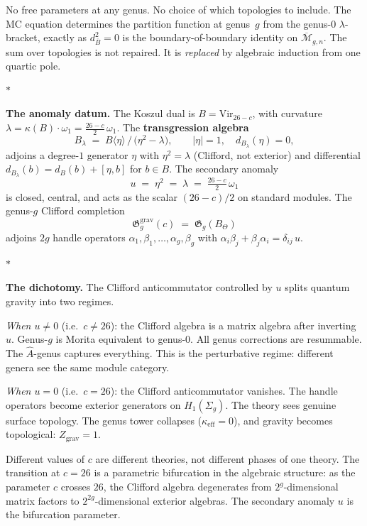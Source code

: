 \documentclass[11pt]{article}
\newcommand{\cM}{\mathcal{M}}
\newcommand{\barB}{\overline{B}}
\newcommand{\sep}{\bigskip\begin{center}$*$\end{center}\medskip}
\begin{document}
No free parameters at any genus.  No choice of which topologies
to include.  The MC equation determines the partition function
at genus~$g$ from the genus-$0$ $\lambda$-bracket, exactly as
$d^2_{\barB} = 0$ is the boundary-of-boundary identity on
$\overline{\cM}_{g,n}$.  The sum over topologies is not repaired.
It is \emph{replaced} by algebraic induction from one quartic pole.

\sep

\noindent\textbf{The anomaly datum.}
The Koszul dual is $B = \mathrm{Vir}_{26-c}$, with curvature
$\lambda = \kappa(B) \cdot \omega_1 = \tfrac{26-c}{2}\,\omega_1$.
The \textbf{transgression algebra}
\[
B_\lambda \;=\; B\langle\eta\rangle \,\big/\,
\bigl(\eta^2 - \lambda\bigr),
\qquad |\eta| = 1,\quad d_{B_\lambda}(\eta) = 0,
\]
adjoins a degree-$1$ generator $\eta$ with $\eta^2 = \lambda$
(Clifford, not exterior) and differential
$d_{B_\lambda}(b) = d_B(b) + [\eta, b]$ for $b \in B$.
The secondary anomaly
\[
u \;=\; \eta^2 \;=\; \lambda \;=\; \tfrac{26-c}{2}\,\omega_1
\]
is closed, central, and acts as the scalar $(26-c)/2$ on
standard modules.  The genus-$g$ Clifford completion
\[
\mathfrak{G}_g^{\mathrm{grav}}(c) \;=\;
\mathfrak{G}_g(B_\Theta)
\]
adjoins $2g$ handle operators $\alpha_1, \beta_1, \ldots,
\alpha_g, \beta_g$ with $\alpha_i\beta_j + \beta_j\alpha_i
= \delta_{ij}\,u$.

\sep

\noindent\textbf{The dichotomy.}
The Clifford anticommutator controlled by $u$ splits quantum
gravity into two regimes.

\emph{When $u \neq 0$} (i.e.\ $c \neq 26$): the Clifford algebra
is a matrix algebra after inverting $u$.  Genus-$g$ is Morita
equivalent to genus-$0$.  All genus corrections are resummable.
The $\hat{A}$-genus captures everything.  This is the perturbative
regime: different genera see the same module category.

\emph{When $u = 0$} (i.e.\ $c = 26$): the Clifford anticommutator
vanishes.  The handle operators become exterior generators on
$H_1(\Sigma_g)$.  The theory sees genuine surface topology.
The genus tower collapses ($\kappa_{\mathrm{eff}} = 0$), and
gravity becomes topological: $Z_{\mathrm{grav}} = 1$.

Different values of $c$ are different theories, not different
phases of one theory.  The transition at $c = 26$ is a parametric
bifurcation in the algebraic structure: as the parameter $c$
crosses $26$, the Clifford algebra degenerates from
$2^g$-dimensional matrix factors to $2^{2g}$-dimensional exterior
algebras.  The secondary anomaly $u$ is the bifurcation parameter.
\end{document}
